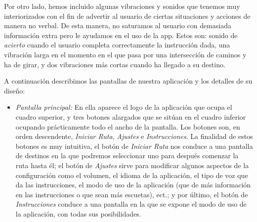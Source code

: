 Por otro lado, hemos incluido algunas vibraciones y sonidos que tenemos muy interiorizados con el fin de advertir al usuario de ciertas situaciones y acciones de manera no verbal. De esta manera, no saturamos al usuario con demasiada información extra pero le ayudamos en el uso de la app. Estos son: sonido de \textit{acierto} cuando el usuario completa correctamente la instrucción dada, una vibración larga en el momento en el que pasa por una intersección de caminos y ha de girar, y dos vibraciones más cortas cuando ha llegado a su destino.

A continuación describimos las pantallas de nuestra aplicación y los detalles de su diseño:

\begin{itemize}
	\item \textit{Pantalla principal:} En ella aparece el logo de la aplicación que ocupa el cuadro superior, y tres botones alargados que se sitúan en el cuadro inferior ocupando prácticamente todo el ancho de la pantalla. Los botones son, en orden descendente, \textit{Iniciar Ruta}, \textit{Ajustes} e \textit{Instrucciones}. La finalidad de estos botones es muy intuitiva, el botón de \textit{Iniciar Ruta} nos conduce a una pantalla de destinos en la que podremos seleccionar uno para después comenzar la ruta hasta él; el botón de \textit{Ajustes} sirve para modificar algunos aspectos de la configuración como el volumen, el idioma de la aplicación, el tipo de voz que da las instrucciones, el modo de uso de la aplicación (que de más información en las instrucciones o que sean más escuetas), ect.; y por último, el botón de \textit{Instrucciones} conduce a una pantalla en la que se expone el modo de uso de la aplicación, con todas sus posibilidades.
	

\end{itemize}
